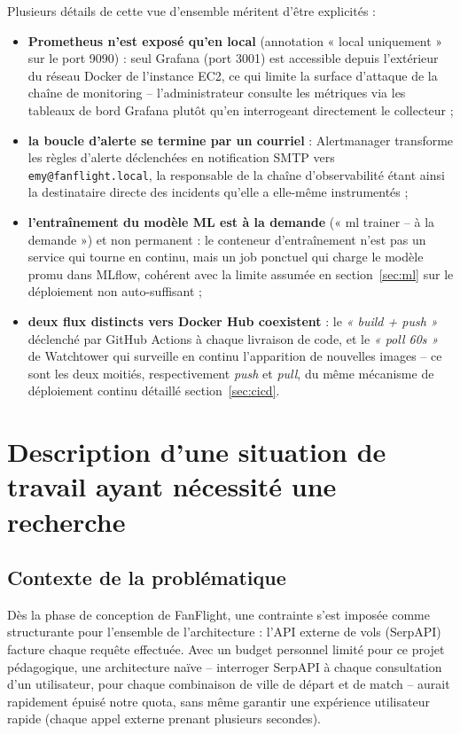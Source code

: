 \documentclass[11pt,a4paper]{report}
\newcommand{\code}[1]{\lstinline{#1}}
\begin{document}
Plusieurs détails de cette vue d'ensemble méritent d'être explicités :
\begin{itemize}
  \item \textbf{Prometheus n'est exposé qu'en local} (annotation « local uniquement » sur le port 9090) : seul Grafana (port 3001) est accessible depuis l'extérieur du réseau Docker de l'instance EC2, ce qui limite la surface d'attaque de la chaîne de monitoring -- l'administrateur consulte les métriques via les tableaux de bord Grafana plutôt qu'en interrogeant directement le collecteur ;
  \item \textbf{la boucle d'alerte se termine par un courriel} : Alertmanager transforme les règles d'alerte déclenchées en notification SMTP vers \code{emy@fanflight.local}, la responsable de la chaîne d'observabilité étant ainsi la destinataire directe des incidents qu'elle a elle-même instrumentés ;
  \item \textbf{l'entraînement du modèle ML est à la demande} (« ml trainer -- à la demande ») et non permanent : le conteneur d'entraînement n'est pas un service qui tourne en continu, mais un job ponctuel qui charge le modèle promu dans MLflow, cohérent avec la limite assumée en section~\ref{sec:ml} sur le déploiement non auto-suffisant ;
  \item \textbf{deux flux distincts vers Docker Hub coexistent} : le \emph{« build + push »} déclenché par GitHub Actions à chaque livraison de code, et le \emph{« poll 60s »} de Watchtower qui surveille en continu l'apparition de nouvelles images -- ce sont les deux moitiés, respectivement \emph{push} et \emph{pull}, du même mécanisme de déploiement continu détaillé section~\ref{sec:cicd}.
\end{itemize}

\chapter{Description d'une situation de travail ayant nécessité une recherche}
\label{chap:recherche}

\section{Contexte de la problématique}

Dès la phase de conception de FanFlight, une contrainte s'est imposée comme structurante pour l'ensemble de l'architecture : l'API externe de vols (SerpAPI) facture chaque requête effectuée. Avec un budget personnel limité pour ce projet pédagogique, une architecture naïve -- interroger SerpAPI à chaque consultation d'un utilisateur, pour chaque combinaison de ville de départ et de match -- aurait rapidement épuisé notre quota, sans même garantir une expérience utilisateur rapide (chaque appel externe prenant plusieurs secondes).
\end{document}
